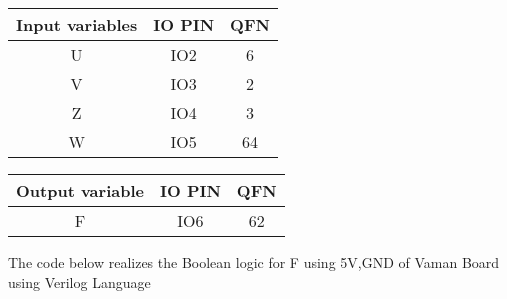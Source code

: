 \documentclass[10pt, a4paper]{article}
\begin{document}
\begin{center}
\begin{tabular}{|c|c|c|}
\hline
\textbf{Input variables}&\textbf{IO PIN}&\textbf{QFN}\\
\hline
U & IO2&6\\  
\hline
V & IO3 &2\\ 
\hline
Z & IO4 &3\\
\hline
W & IO5 &64\\
\hline
\end{tabular}
\end{center}
\begin{center}
\begin{tabular}{|c|c|c|}
\hline
\textbf{Output variable}&\textbf{IO PIN}&\textbf{QFN}\\
\hline
F & IO6 &62\\  
\hline
\end{tabular}
\end{center}
The code below realizes the Boolean logic for F   using 5V,GND of Vaman Board using Verilog Language
\begin{center}
\end{center}
\end{document}

